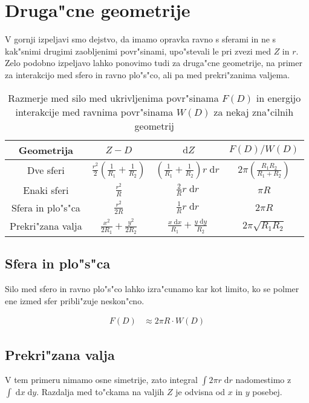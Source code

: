 \documentclass[a4paper,10pt]{article}
\newcommand{\dd}{\;\mathrm{d}}
\begin{document}
\newpage
\section{Druga"cne geometrije}

V gornji izpeljavi smo dejstvo, da imamo opravka ravno s sferami in ne s kak"snimi drugimi zaobljenimi povr"sinami, upo"stevali le pri zvezi med $Z$ in $r$. 
Zelo podobno izpeljavo lahko ponovimo tudi za druga"cne geometrije, na primer za interakcijo med sfero in ravno plo"s"co, ali pa med prekri"zanima valjema. 

\begin{table}[h]
\begin{tabular}{c|c|c|c}
 Geometrija & $Z - D$ & $\dd Z$ & $F(D) / W(D)$ \\
 \hline
 Dve sferi & $\frac{r^2}{2} \left(\frac{1}{R_1} + \frac{1}{R_2}\right)$ & $\left(\frac{1}{R_1} + \frac{1}{R_2}\right)r \dd r$ & $2\pi \left(\frac{R_1R_2}{R_1 + R_2}\right)$ \\
 \hline
 Enaki sferi & $\frac{r^2}{R}$ & $\frac{2}{R}r \dd r$ & $\pi R$ \\
 \hline
 Sfera in plo"s"ca & $\frac{r^2}{2R}$ & $\frac{1}{R} r \dd r$ & $2\pi R$ \\
 \hline
 Prekri"zana valja & $\frac{x^2}{2R_1} + \frac{y^2}{2R_2}$ & $\frac{x \dd x}{R_1} + \frac{y \dd y}{R_2}$ & $2\pi \sqrt{R_1R_2}$
\end{tabular}
\label{tab:geometrije}
\caption{Razmerje med silo med ukrivljenima povr"sinama $F(D)$ in energijo interakcije med ravnima povr"sinama $W(D)$ za nekaj zna"cilnih geometrij}
\end{table}

\subsection{Sfera in plo"s"ca}

Silo med sfero in ravno plo"s"co lahko izra"cunamo kar kot limito, ko se polmer ene izmed sfer pribli"zuje neskon"cno. 

\begin{align}
 F(D) &\approx 2\pi R\cdot W(D)
\end{align}


\subsection{Prekri"zana valja}

V tem primeru nimamo osne simetrije, zato integral $\int 2\pi r \dd r$ nadomestimo z $\int \dd x \dd y$. 
Razdalja med to"ckama na valjih $Z$ je odvisna od $x$ in $y$ posebej. 
\end{document}
